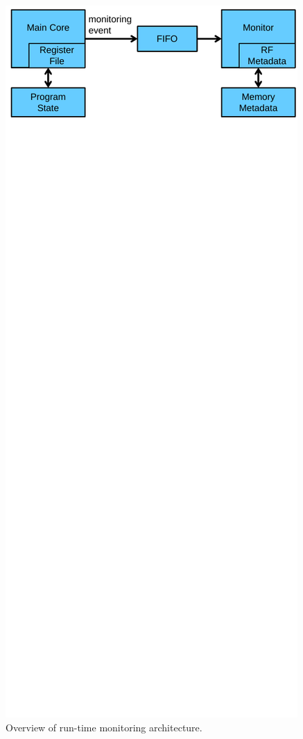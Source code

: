 \begin{figure}
  \begin{center}
    \includegraphics{figs/monitoring_architecture.pdf}
    \vspace{-0.2in}
    \caption{Overview of run-time monitoring architecture.}
    \label{fig:monitoring.overview} 
    \vspace{-0.1in}
  \end{center}
\end{figure}

